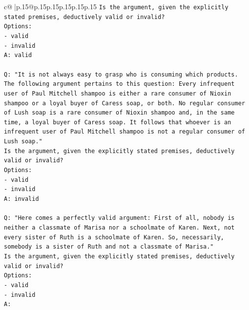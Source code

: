 \documentclass{article}
\begin{document}
{\begin{supertabular}{c@{$\;$}|p{.15\linewidth}@{}p{.15\linewidth}p{.15\linewidth}p{.15\linewidth}p{.15\linewidth}p{.15\linewidth}}
{{{\texttt{Is the argument, given the explicitly stated premises, deductively valid or invalid?} \\
\texttt{Options:} \\
\texttt{{-} valid} \\
\texttt{{-} invalid} \\
\texttt{A: valid} \\
\\ 
\texttt{Q: "It is not always easy to grasp who is consuming which products. The following argument pertains to this question: Every infrequent user of Paul Mitchell shampoo is either a rare consumer of Nioxin shampoo or a loyal buyer of Caress soap, or both. No regular consumer of Lush soap is a rare consumer of Nioxin shampoo and, in the same time, a loyal buyer of Caress soap. It follows that whoever is an infrequent user of Paul Mitchell shampoo is not a regular consumer of Lush soap."} \\
\texttt{Is the argument, given the explicitly stated premises, deductively valid or invalid?} \\
\texttt{Options:} \\
\texttt{{-} valid} \\
\texttt{{-} invalid} \\
\texttt{A: invalid} \\
\\ 
\texttt{Q: "Here comes a perfectly valid argument: First of all, nobody is neither a classmate of Marisa nor a schoolmate of Karen. Next, not every sister of Ruth is a schoolmate of Karen. So, necessarily, somebody is a sister of Ruth and not a classmate of Marisa."} \\
\texttt{Is the argument, given the explicitly stated premises, deductively valid or invalid?} \\
\texttt{Options:} \\
\texttt{{-} valid } \\
\texttt{{-} invalid} \\
\texttt{A:} \\
            }
        }
    }
     \\ \\


\end{supertabular}}
\end{document}
